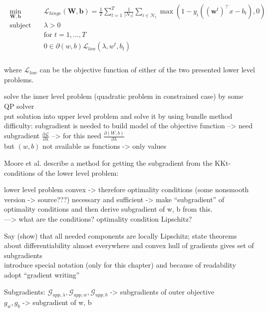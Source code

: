\begin{align}
	\begin{split}
	\min_{\bm{W},\bm{b}} \quad &  \mathcal{L}_{hinge}(\bm{W},\bm{b}) = \frac{1}{T}\sum_{t=1}^T\frac{1}{|\mathcal{N}_t|}\sum_{i \in \mathcal{N}_t}{\max\left(1-y_i((\bm{w}^t)^{\top}x-b_t),0\right)}\\
	\text{subject to} \quad & \lambda > 0 \\
	& \text{for } t = 1,...,T \\
	& 0 \in \partial(w,b)\mathcal{L}_{low}(\lambda,w^t,b_t) \\
\end{split}
\label{SVM_opt_cond}
\end{align}

where \(\mathcal{L}_{low}\) can be the objective function of either of the two presented lower level problems.



solve the inner level problem (quadratic problem in constrained case) by some QP solver \\
put solution into upper level problem and solve it by using bundle method \\
difficulty: subgradient is needed to build model of the objective function --> need subgradient \(\frac{\partial \mathcal{L}}{\partial \lambda}\) --> for this need \(\frac{\partial (W,b)}{\partial \lambda}\) \\
but \((w,b)\) not available as functions -> only values

Moore et al. \cite{Moore2011} describe a method for getting the subgradient from the KKt-conditions of the lower level problem:

lower level problem convex -> therefore optimality conditions (some nonsmooth version -> source???) necessary and sufficient -> make ``subgradient'' of optimality conditions and then derive subgradient of w, b from this. \\
---> what are the conditions? optimality condition Lipschitz? 

Say (show) that all needed components are locally Lipschitz; state theorems about differentiability almost everywhere and convex hull of gradients gives set of subgradients\\
introduce special notation (only for this chapter) and because of readability adopt ``gradient writing''

Subgradients:
\(\mathcal{G}_{upp,\lambda}, \mathcal{G}_{upp,w},\mathcal{G}_{upp,b}\) -> subgradients of outer objective \\
\(g_w, g_b\) -> subgradient of w, b

